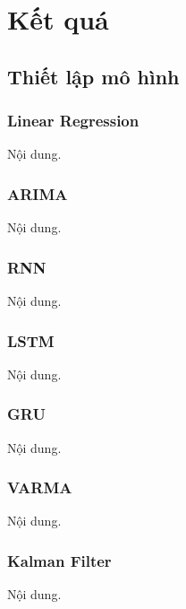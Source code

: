 \section{Kết quá}

\subsection{Thiết lập mô hình} 
\subsubsection{Linear Regression}
Nội dung.

\subsubsection{ARIMA}
Nội dung.

\subsubsection{RNN}
Nội dung.


\subsubsection{LSTM}
Nội dung.

\subsubsection{GRU}
Nội dung.


\subsubsection{VARMA}
Nội dung.


\subsubsection{Kalman Filter}
Nội dung.




